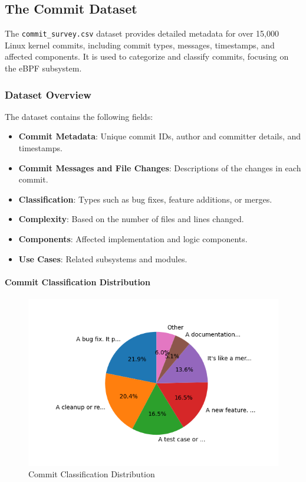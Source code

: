 \subsection{The Commit Dataset}

The \texttt{commit\_survey.csv} dataset provides detailed metadata for over 15,000 Linux kernel commits, including commit types, messages, timestamps, and affected components. It is used to categorize and classify commits, focusing on the eBPF subsystem.

\subsubsection{Dataset Overview}

The dataset contains the following fields:

\begin{itemize}
    \item \textbf{Commit Metadata}: Unique commit IDs, author and committer details, and timestamps.
    \item \textbf{Commit Messages and File Changes}: Descriptions of the changes in each commit.
    \item \textbf{Classification}: Types such as bug fixes, feature additions, or merges.
    \item \textbf{Complexity}: Based on the number of files and lines changed.
    \item \textbf{Components}: Affected implementation and logic components.
    \item \textbf{Use Cases}: Related subsystems and modules.
\end{itemize}

% 
% 

\paragraph{Commit Classification Distribution}

\begin{figure}[ht]
    \centering
    \includegraphics[width=\linewidth]{feature-analysis/commit_pie_chart_commit_classification.png}
    \caption{Commit Classification Distribution}
    \label{fig:commit_pie_chart_commit_classification}
\end{figure}


